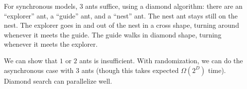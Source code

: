 \documentclass{article}
\begin{document}
For synchronous models, $3$ ants suffice, using a diamond algorithm: there are
an ``explorer'' ant, a ``guide'' ant, and a ``nest'' ant. The nest ant stays
still on the nest. The explorer goes in and out of the nest in a cross shape,
turning around whenever it meets the guide. The guide walks in diamond shape,
turning whenever it meets the explorer.

We can show that $1$ or $2$ ants is insufficient. With randomization, we can do
the asynchronous case with 3 ants (though this takes expected $\Omega(2^D)$
time). Diamond search can parallelize well.
\end{document}
